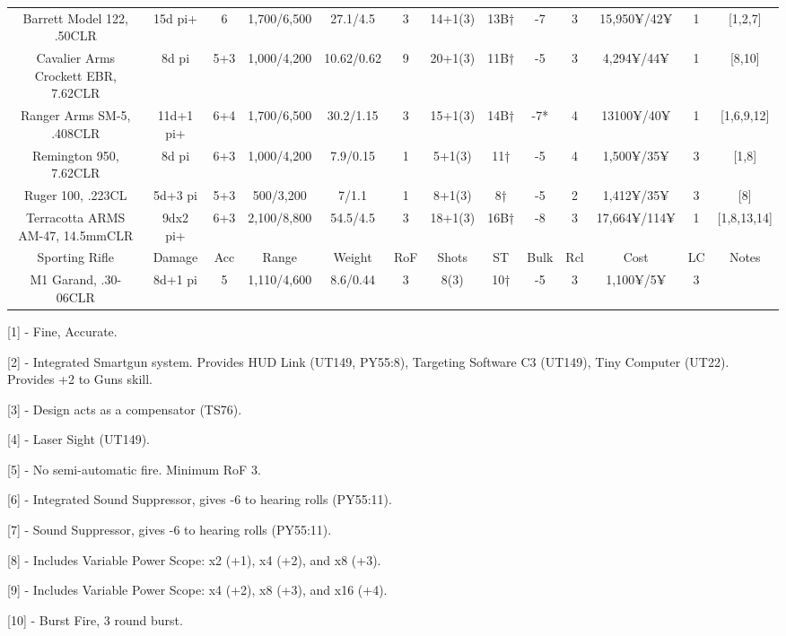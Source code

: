 \begin{center}
\begin{adjustwidth}{-10mm}{}
{\begin{tabular}{|c|c|c|c|c|c|c|c|c|c|c|c|c|}
				Barrett Model 122, .50CLR & 15d pi+ & 6 & 1,700/6,500 &  27.1/4.5 & 3 & 14+1(3) & 13B†  & -7 & 3 & 15,950¥/42¥ & 1 & [1,2,7] \\
				Cavalier Arms Crockett EBR, 7.62CLR & 8d pi & 5+3 & 1,000/4,200 & 10.62/0.62 &  9 & 20+1(3) & 11B† & -5 & 3 & 4,294¥/44¥ & 1 & [8,10] \\
				Ranger Arms SM-5, .408CLR & 11d+1 pi+ & 6+4 & 1,700/6,500 & 30.2/1.15 & 3 & 15+1(3) & 14B† & -7* & 4 & 13100¥/40¥  & 1 & [1,6,9,12] \\ 
				Remington 950, 7.62CLR &  8d pi & 6+3 & 1,000/4,200 & 7.9/0.15 & 1 & 5+1(3) & 11† & -5 & 4 & 1,500¥/35¥ & 3 & [1,8] \\
				Ruger 100, .223CL & 5d+3 pi & 5+3 & 500/3,200 & 7/1.1 & 1 & 8+1(3) & 8† & -5 & 2 & 1,412¥/35¥ & 3 & [8]\\
				Terracotta ARMS AM-47, 14.5mmCLR & 9dx2 pi+ & 6+3 & 2,100/8,800 &  54.5/4.5 & 3 & 18+1(3) & 16B† & -8 & 3 &  17,664¥/114¥ & 1 & [1,8,13,14] \\
				\hline
				Sporting Rifle & Damage & Acc & Range & Weight & RoF & Shots & ST & Bulk & Rcl & Cost & LC & Notes\\
				\hline
				M1 Garand, .30-06CLR & 8d+1 pi & 5 & 1,110/4,600 & 8.6/0.44 & 3 & 8(3) & 10† & -5 & 3 & 1,100¥/5¥ & 3 & \\
				\hline
			\end{tabular}
		}
	\end{adjustwidth}
\end{center}

[1] - Fine, Accurate.

[2] - Integrated Smartgun system. Provides HUD Link (UT149, PY55:8), Targeting Software C3 (UT149), Tiny Computer (UT22). Provides +2 to Guns skill.

[3] - Design acts as a compensator (TS76).

[4] - Laser Sight (UT149).

[5] - No semi-automatic fire. Minimum RoF 3.

[6] - Integrated Sound Suppressor, gives -6 to hearing rolls (PY55:11).

[7] - Sound Suppressor, gives -6 to hearing rolls (PY55:11).

[8] - Includes Variable Power Scope: x2 (+1), x4 (+2), and x8 (+3).

[9] - Includes Variable Power Scope: x4 (+2), x8 (+3), and x16 (+4).

[10] - Burst Fire, 3 round burst.

